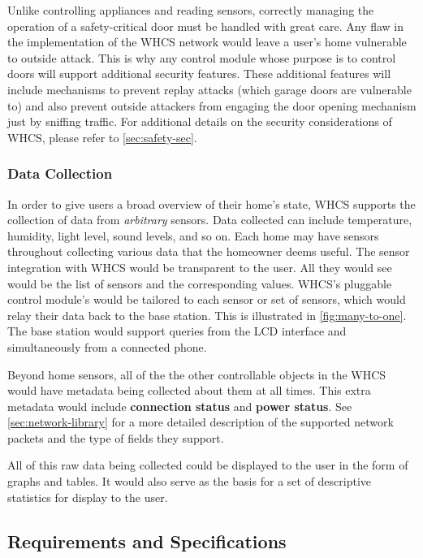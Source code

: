 Unlike controlling appliances and reading sensors, correctly managing the
operation of a safety-critical door must be handled with great care. Any flaw
in the implementation of the WHCS network would leave a user's home vulnerable
to outside attack. This is why any control module whose purpose is to control
doors will support additional security features. These additional features will
include mechanisms to prevent replay attacks (which garage doors are vulnerable
to) and also prevent outside attackers from engaging the door opening mechanism
just by sniffing traffic. For additional details on the security considerations
of WHCS, please refer to \autoref{sec:safety-sec}.

\subsubsection{Data Collection}
In order to give users a broad overview of their home's state, WHCS supports
the collection of data from \emph{arbitrary} sensors. Data collected can
include temperature, humidity, light level, sound levels, and so on. Each home
may have sensors throughout collecting various data that the homeowner deems
useful. The sensor integration with WHCS would be transparent to the user. All
they would see would be the list of sensors and the corresponding values.
WHCS's pluggable control module's would be tailored to each sensor or set of
sensors, which would relay their data back to the base station. This is
illustrated in \autoref{fig:many-to-one}. The base station would support
queries from the LCD interface and simultaneously from a connected phone.


Beyond home sensors, all of the the other controllable objects in the WHCS
would have metadata being collected about them at all times. This extra metadata
would include \textbf{connection status} and \textbf{power status}. See
\autoref{sec:network-library} for a more detailed description of the supported
network packets and the type of fields they support.

All of this raw data being collected could be displayed to the user in the form
of graphs and tables. It would also serve as the basis for a set of descriptive
statistics for display to the user.

\subsection{Requirements and Specifications}

